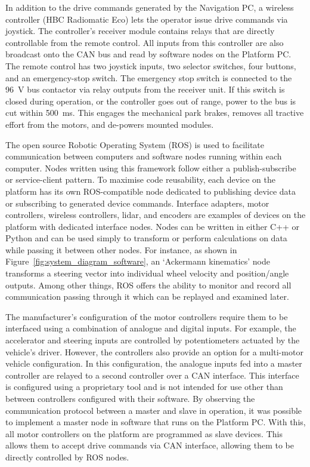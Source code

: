\documentclass[preprint,authoryear,12pt]{elsarticle}
\begin{document}
        In addition to the drive commands generated by the Navigation PC, a wireless controller (HBC Radiomatic Eco) lets the operator issue drive commands via joystick.
        The controller's receiver module contains relays that are directly controllable from the remote control.
        All inputs from this controller are also broadcast onto the CAN bus and read by software nodes on the Platform PC.
        The remote control has two joystick inputs, two selector switches, four buttons, and an emergency-stop switch.
        The emergency stop switch is connected to the \SI{96}{\volt} bus contactor via relay outputs from the receiver unit.
        If this switch is closed during operation, or the controller goes out of range, power to the bus is cut within \SI{500}{\milli\second}.
        This engages the mechanical park brakes, removes all tractive effort from the motors, and de-powers mounted modules.

        The open source Robotic Operating System (ROS) is used to facilitate communication between computers and software nodes running within each computer.
        Nodes written using this framework follow either a publish-subscribe or service-client pattern.
        To maximise code reusability, each device on the platform has its own ROS-compatible node dedicated to publishing device data or subscribing to generated device commands.
        Interface adapters, motor controllers, wireless controllers, lidar, and encoders are examples of devices on the platform with dedicated interface nodes.
        Nodes can be written in either C++ or Python and can be used simply to transform or perform calculations on data while passing it between other nodes.
        For instance, as shown in Figure~\ref{fig:system_diagram_software}, an `Ackermann kinematics' node transforms a steering vector into individual wheel velocity and position/angle outputs.
        Among other things, ROS offers the ability to monitor and record all communication passing through it which can be replayed and examined later.

        The manufacturer's configuration of the motor controllers require them to be interfaced using a combination of analogue and digital inputs.
        For example, the accelerator and steering inputs are controlled by potentiometers actuated by the vehicle's driver.
        However, the controllers also provide an option for a multi-motor vehicle configuration.
        In this configuration, the analogue inputs fed into a master controller are relayed to a second controller over a CAN interface.
        This interface is configured using a proprietary tool and is not intended for use other than between controllers configured with their software.
        By observing the communication protocol between a master and slave in operation, it was possible to implement a master node in software that runs on the Platform PC.
        With this, all motor controllers on the platform are programmed as slave devices.
        This allows them to accept drive commands via CAN interface, allowing them to be directly controlled by ROS nodes.
\end{document}
